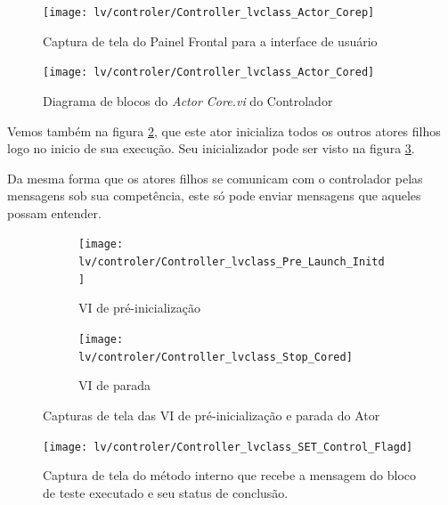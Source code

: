         \begin{figure}
                \centering
                \texttt{[image: lv/controler/Controller\_lvclass\_Actor\_Corep]}
                \caption{Captura de tela do Painel Frontal para a interface de usuário}
                \label{fig:cntrlpanel}
        \end{figure}
        
        \begin{figure}
                \centering
                \texttt{[image: lv/controler/Controller\_lvclass\_Actor\_Cored]}
                \caption{Diagrama de blocos do \textit{Actor Core.vi} do Controlador}
                \label{fig:cntrlcore}
        \end{figure}
        
        Vemos também na figura \ref{fig:cntrlcore}, que este ator inicializa todos os outros atores filhos logo no inicio de sua execução. Seu inicializador pode ser visto na figura \ref{fig:cntrlprestop}.
        
        Da mesma forma que os atores filhos se comunicam com o controlador pelas mensagens sob sua competência, este só pode enviar mensagens que aqueles possam entender.
        
        \begin{figure}
                \centering
                \begin{subfigure}[b]{0.45\textwidth}
                    \texttt{[image: lv/controler/Controller\_lvclass\_Pre\_Launch\_Initd]}
                    \caption{VI de pré-inicialização}
                \end{subfigure}
                \begin{subfigure}[b]{0.45\textwidth}
                    \texttt{[image: lv/controler/Controller\_lvclass\_Stop\_Cored]}
                    \caption{VI de parada}
                \end{subfigure}
                \caption{Capturas de tela das VI de pré-inicialização e parada do Ator}
                \label{fig:cntrlprestop}
        \end{figure}
        
        \begin{figure}
                \centering
                \texttt{[image: lv/controler/Controller\_lvclass\_SET\_Control\_Flagd]}
                \caption{Captura de tela do método interno que recebe a mensagem do bloco de teste executado e seu status de conclusão.}
                \label{fig:cntrlset}
        \end{figure}
        
